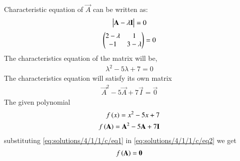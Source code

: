 Characteristic equation of $\vec{A}$ can be written as:
\begin{align}
    \begin{vmatrix}\mathbf{A}-\lambda\mathbf{I}\end{vmatrix}=0
\end{align}
\begin{align}
    \begin{pmatrix}2-\lambda&1\\-1&3-\lambda\end{pmatrix}=0
\end{align}
 The characteristics equation of the matrix will  be,
 \begin{align}
     \lambda^{2}-5\lambda + 7 = 0
 \end{align}
 The characteristics equation will satisfy its own matrix 
 \begin{align}
     \vec{A}^{2}-5\vec{A}+7\vec{I}=\vec{0}\label{eq:solutions/4/1/1/c/eq1}
 \end{align}
The given polynomial 
 \begin{align}
     f\left(x\right)=x^{2}-5x+7\\
     f\left(\mathbf{A}\right)=\mathbf{A}^{2}-5\mathbf{A}+7\mathbf{I}\label{eq:solutions/4/1/1/c/eq2}
 \end{align}
 substituting \eqref{eq:solutions/4/1/1/c/eq1} in \eqref{eq:solutions/4/1/1/c/eq2} we get
 \begin{align}
     f\left(\mathbf{A}\right)=\mathbf{0}
 \end{align}
